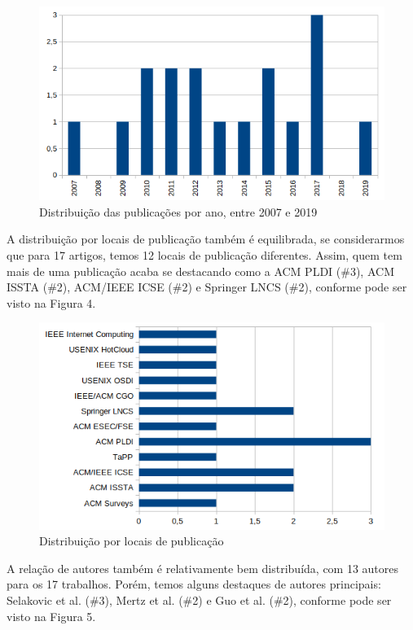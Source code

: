 \documentclass[sigconf]{acmart}
\begin{document}
\begin{figure}[H]
  \centering
  \includegraphics[width=\linewidth]{pub_per_year}
  \caption{Distribuição das publicações por ano, entre 2007 e 2019}
\end{figure}

A distribuição por locais de publicação também é equilibrada, se considerarmos que para 17 artigos, temos 12 locais de publicação diferentes. Assim, quem tem mais de uma publicação acaba se destacando como a ACM PLDI (\#3), ACM ISSTA (\#2), ACM/IEEE ICSE (\#2) e Springer LNCS (\#2), conforme pode ser visto na Figura 4.

\begin{figure}[H]
  \centering
  \includegraphics[width=\linewidth]{publishers}
  \caption{Distribuição por locais de publicação}
\end{figure}

A relação de autores também é relativamente bem distribuída, com 13 autores para os 17 trabalhos. Porém, temos alguns destaques de autores principais: Selakovic et al. (\#3), Mertz et al. (\#2) e Guo et al. (\#2), conforme pode ser visto na Figura 5. 
\end{document}
